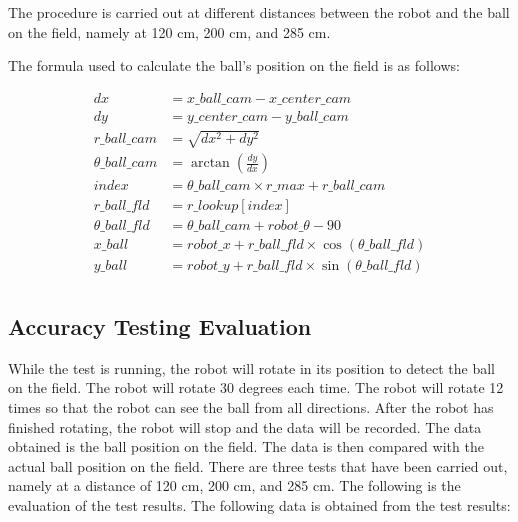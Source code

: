 The procedure is carried out at different distances between the robot and the ball on the field, namely at 120 cm, 200 cm, and 285 cm.

The formula used to calculate the ball's position on the field is as follows: 

\begin{equation}
  \begin{aligned}
    dx &= x\_ball\_cam - x\_center\_cam \\
    dy &= y\_center\_cam - y\_ball\_cam \\
    r\_ball\_cam &= \sqrt{dx^2 + dy^2} \\
    \theta\_ball\_cam &= \arctan(\frac{dy}{dx}) \\
    index &= \theta\_ball\_cam \times r\_max + r\_ball\_cam \\ 
    r\_ball\_fld &= r\_lookup[index] \\
    \theta\_ball\_fld &= \theta\_ball\_cam + robot\_\theta - 90 \\
    x\_ball &= robot\_x + r\_ball\_fld \times \cos(\theta\_ball\_fld) \\
    y\_ball &= robot\_y + r\_ball\_fld \times \sin(\theta\_ball\_fld) \\
  \end{aligned}
\end{equation}

\subsection{Accuracy Testing Evaluation}
\label{sec:analisispengujian}

While the test is running, the robot will rotate in its position to detect the ball on the field. The robot will rotate 30 degrees each time. The robot will rotate 12 times so that the robot can see the ball from all directions. After the robot has finished rotating, the robot will stop and the data will be recorded. The data obtained is the ball position on the field. The data is then compared with the actual ball position on the field. There are three tests that have been carried out, namely at a distance of 120 cm, 200 cm, and 285 cm. The following is the evaluation of the test results. The following data is obtained from the test results:


